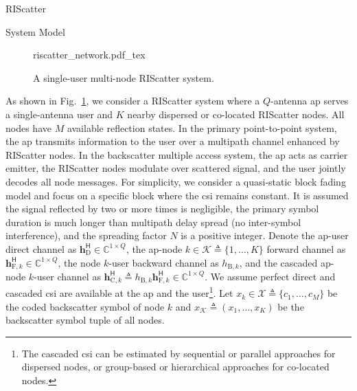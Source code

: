 \documentclass[journal]{IEEEtran}
\begin{document}
\begin{section}{RIScatter}
	\begin{subsection}{System Model}
		\label{se:system_model}
		\begin{figure}[!t]
			\centering
			\def\svgwidth{0.7\columnwidth}
			\footnotesize{
				{riscatter_network.pdf_tex}
			}
			\caption{A single-user multi-node RIScatter system.}
			\label{fg:riscatter_network}
		\end{figure}
		As shown in Fig.~\ref{fg:riscatter_network}, we consider a RIScatter system where a $Q$-antenna \gls{ap} serves a single-antenna user and $K$ nearby dispersed or co-located RIScatter nodes.
		All nodes have $M$ available reflection states.
		In the primary point-to-point system, the \gls{ap} transmits information to the user over a multipath channel enhanced by RIScatter nodes.
		In the backscatter multiple access system, the \gls{ap} acts as carrier emitter, the RIScatter nodes modulate over scattered signal, and the user jointly decodes all node messages.
		For simplicity, we consider a quasi-static block fading model and focus on a specific block where the \gls{csi} remains constant.
		It is assumed the signal reflected by two or more times is negligible, the primary symbol duration is much longer than multipath delay spread (no inter-symbol interference), and the spreading factor $N$ is a positive integer.
		Denote the \gls{ap}-user direct channel as $\boldsymbol{h}_{\text{D}}^\mathsf{H} \in \mathbb{C}^{1 \times Q}$, the \gls{ap}-node $k \in \mathcal{K} \triangleq \{1,\ldots,K\}$ forward channel as $\boldsymbol{h}_{\text{F},k}^\mathsf{H} \in \mathbb{C}^{1 \times Q}$, the node $k$-user backward channel as $h_{\text{B},k}$, and the cascaded \gls{ap}-node $k$-user channel as $\boldsymbol{h}_{\text{C},k}^\mathsf{H} \triangleq h_{\text{B},k} \boldsymbol{h}_{\text{F},k}^\mathsf{H} \in \mathbb{C}^{1 \times Q}$.
		We assume perfect direct and cascaded \gls{csi} are available at the \gls{ap} and the user\footnote{The cascaded \gls{csi} can be estimated by sequential \cite{Bharadia2015,Yang2015b,Guo2019g} or parallel \cite{Jin2021a} approaches for dispersed nodes, or group-based \cite{Zheng2019} or hierarchical \cite{You2019} approaches for co-located nodes.}.
		Let $x_k \in \mathcal{X} \triangleq \{c_1,\ldots,c_M\}$ be the coded backscatter symbol of node $k$ and $x_{\mathcal{K}} \triangleq (x_1,\ldots,x_K)$ be the backscatter symbol tuple of all nodes.

\end{subsection}
\end{section}
\end{document}
